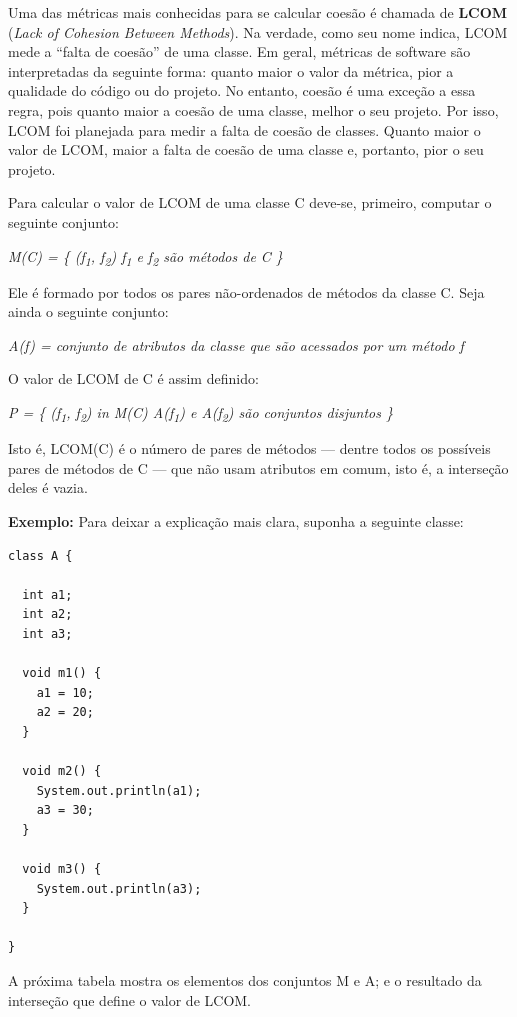 \documentclass[
  11pt,
  twoside]{book}
\begin{document}
Uma das métricas mais conhecidas para se calcular coesão é chamada de
\textbf{LCOM} (\emph{Lack of Cohesion Between Methods}). Na verdade,
como seu nome indica, LCOM mede a ``falta de coesão'' de uma classe. Em
geral, métricas de software são interpretadas da seguinte forma: quanto
maior o valor da métrica, pior a qualidade do código ou do projeto. No
entanto, coesão é uma exceção a essa regra, pois quanto maior a coesão
de uma classe, melhor o seu projeto. Por isso, LCOM foi planejada para
medir a falta de coesão de classes. Quanto maior o valor de LCOM, maior
a falta de coesão de uma classe e, portanto, pior o seu projeto.

Para calcular o valor de LCOM de uma classe C deve-se, primeiro,
computar o seguinte conjunto:

\emph{M(C) = \{ (f\textsubscript{1}, f\textsubscript{2}) \textbar{}
f\textsubscript{1} e f\textsubscript{2} são métodos de C \}}

Ele é formado por todos os pares não-ordenados de métodos da classe C.
Seja ainda o seguinte conjunto:

\emph{A(f) = conjunto de atributos da classe que são acessados por um
método f}

O valor de LCOM de C é assim definido:

\emph{P = \textbar{} \{ (f\textsubscript{1}, f\textsubscript{2}) in M(C)
\textbar{} A(f\textsubscript{1}) e A(f\textsubscript{2}) são conjuntos
disjuntos \} \textbar{}}

Isto é, LCOM(C) é o número de pares de métodos --- dentre todos os
possíveis pares de métodos de C --- que não usam atributos em comum,
isto é, a interseção deles é vazia.

\newpage

\textbf{Exemplo:} Para deixar a explicação mais clara, suponha a
seguinte classe:

\begin{lstlisting}
class A {

  int a1;
  int a2;
  int a3;

  void m1() {
    a1 = 10;
    a2 = 20;
  }

  void m2() {
    System.out.println(a1);
    a3 = 30;
  }

  void m3() {
    System.out.println(a3);
  }

}
\end{lstlisting}

A próxima tabela mostra os elementos dos conjuntos M e A; e o resultado
da interseção que define o valor de LCOM.
\end{document}
